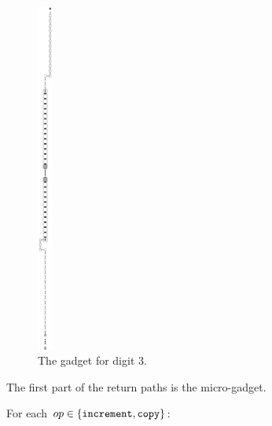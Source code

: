 \begin{figure}[H]
    \centering
    \includegraphics[width=0.2in]{return_paths/return_from_digit_3}
    \caption{\label{fig:return_from_digit_3} The {\returnfromdigit} gadget for digit 3.}
\end{figure}


The first part of the return paths is the {\returnfromdigit} micro-gadget.

For each $op\in \{ {\tt increment}, {\tt copy} \}$:

